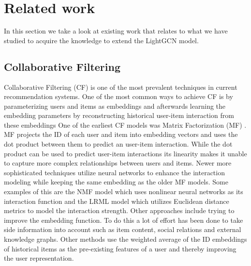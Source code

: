 \section{Related work}
In this section we take a look at existing work that relates to what we have studied to acquire the knowledge to extend the LightGCN model.

\subsection{Collaborative Filtering}
Collaborative Filtering (CF) is one of the most prevalent techniques in current recommendation systems\cite{YT_rec,NGCF_2019,Pint_rec,COL_MEM_NET}.
One of the most common ways to achieve CF is by parameterizing users and items as embeddings and afterwards learning the embedding parameters by reconstructing historical user-item interaction from these embeddings\cite{NGCF_2019}
One of the earliest CF models was Matrix Factorization (MF) \cite{Matrix-factorization-techniques, BAY_PER_RAN}.
MF  projects the ID of each user and item into embedding vectors and uses the dot product between them to predict an user-item interaction.
While the dot product can be used to predict user-item interactions its linearity makes it unable to capture more complex relationships between users and items.
Newer more sophisticated techniques utilize neural networks to enhance the interaction modeling while keeping the same embedding as the older MF models.
Some examples of this are the NMF model\cite{NEU_COL_FIL} which uses nonlinear neural networks as its interaction function and the LRML model\cite{LAT_REL_MET} which utilizes Euclidean distance metrics to model the interaction strength.
Other approaches include trying to improve the embedding function.
To do this a lot of effort has been done to take side information into account such as item content\cite{ATT_COL_FIL_MUL}, social relations\cite{REC_SOC_USE} and external knowledge graphs\cite{KGAT, KNO_GRA_REC}.
Other methods use the weighted average of the ID embeddings of historical items as the pre-existing features of a user and thereby improving the user representation\cite{SVD_PLUSPLUS,FISM}.
 
